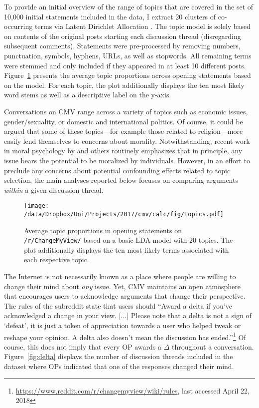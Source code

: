 To provide an initial overview of the range of topics that are covered in the set of 10,000 initial statements included in the data, I extract 20 clusters of co-occurring terms via Latent Dirichlet Allocation \citep{blei2003latent}. The topic model is solely based on contents of the original posts starting each discussion thread (disregarding subsequent comments). Statements were pre-processed by removing numbers, punctuation, symbols, hyphens, URLs, as well as stopwords. All remaining terms were stemmed and only included if they appeared in at least 10 different posts. Figure~\ref{fig:lda} presents the average topic proportions across opening statements based on the model. For each topic, the plot additionally displays the ten most likely word stems as well as a descriptive label on the y-axis.

Conversations on CMV range across a variety of topics such as economic issues, gender/sexuality, or domestic and international politics. Of course, it could be argued that some of these topics---for example those related to religion---more easily lend themselves to concerns about morality. Notwithstanding, recent work in moral psychology by \citet{ryan2014reconsidering} and others routinely emphasizes that in principle, any issue bears the potential to be moralized by individuals. However, in an effort to preclude any concerns about potential confounding effects related to topic selection, the main analyses reported below focuses on comparing arguments \textit{within} a given discussion thread.

\begin{figure}[ht]
\centering
\texttt{[image: /data/Dropbox/Uni/Projects/2017/cmv/calc/fig/topics.pdf]}
\caption[Average topic proportions in opening statements on \texttt{/r/ChangeMyView/}]{Average topic proportions in opening statements on \texttt{/r/ChangeMyView/} based on a basic LDA model with 20 topics. The plot additionally displays the ten most likely terms associated with each respective topic.}\label{fig:lda}
\end{figure}

The Internet is not necessarily known as a place where people are willing to change their mind about \textit{any} issue. Yet, CMV maintains an open atmosphere that encourages users to acknowledge arguments that change their perspective. The rules of the subreddit state that users should ``Award a delta if you've acknowledged a change in your view. [...] Please note that a delta is not a sign of `defeat', it is just a token of appreciation towards a user who helped tweak or reshape your opinion. A delta also doesn't mean the discussion has ended.''\footnote{ \url{https://www.reddit.com/r/changemyview/wiki/rules}, last accessed April 22, 2018} Of course, this does not imply that every OP awards a $\Delta$ throughout a conversation. Figure~\ref{fig:delta} displays the number of discussion threads included in the dataset where OPs indicated that one of the responses changed their mind.

